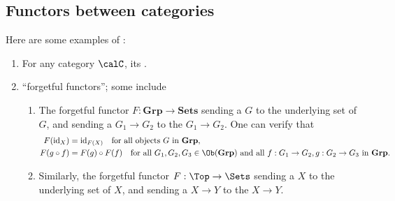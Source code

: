 


\subsection{Functors between categories}





\begin{example}
    Here are some examples of :
    \begin{enumerate}
        \item For any category $\calC$, its .
        \item ``forgetful functors''; some  include 
        \begin{enumerate}
            \item The forgetful functor $F:\mathbf{Grp} \to \mathbf{Sets}$ sending a  $G$ to the underlying set of $G$, and sending a  $G_1 \to G_2$ to the  $G_1 \to G_2$. One can verify that 
              \begin{align*}
                F(\mathrm{id}_X) &= \mathrm{id}_{F(X)} \quad \text{for all objects } G \text{ in } \mathbf{Grp}, \\
                F(g \circ f) &= F(g) \circ F(f) \quad \text{for all } G_1,G_2,G_3 \in \Ob(\mathbf{Grp}) \text{ and all } f: G_1 \to G_2, g: G_2 \to G_3 \text{ in } \mathbf{Grp}.
            \end{align*}

            \item Similarly, the forgetful functor $F: \Top \to \Sets$  sending a  $X$ to the underlying set of $X$, and sending a  $X \to Y$ to the  $X \to Y$.


\end{enumerate}
\end{enumerate}
\end{example}
